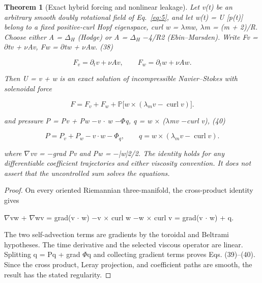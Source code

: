 \documentclass[10pt,letterpaper]{article}
\newtheorem{theorem}{Theorem}[section]
\theoremstyle{remark}
\begin{document}
\begin{theorem}[Exact hybrid forcing and nonlinear leakage]

Let v(t) be an arbitrary smooth doubly rotational field of Eq.~\eqref{eq:5}, and let w(t) = U [p(t)] belong to a fixed positive-curl Hopf eigenspace, curl w = \(\lambda \)mw, \(\lambda \)m = (m + 2)/R. Choose either A = \(\Delta_H\) (Hodge) or A = \(\Delta_H\) \(- \)4/R2 (Ebin–Marsden). Write Fv = \(\partial \)tv + \(\nu \)Av, Fw = \(\partial \)tw + \(\nu \)Aw. (38)


\begin{equation}
\tag{38}\label{eq:38}
F_v=\partial_tv+\nu Av,\qquad F_w=\partial_tw+\nu Aw.
\end{equation}

Then U = v + w is an exact solution of incompressible Navier–Stokes with solenoidal force



\begin{equation}
\tag{39}\label{eq:39}
F=F_v+F_w+\mathbb P\bigl[w\times(\lambda_m v-\operatorname{curl}v)\bigr].
\end{equation}

and pressure P = Pv + Pw \(- \)v \(\cdot \) w \(- \Phi \)q, q = w \(\times \) (\(\lambda \)mv \(- \)curl v), (40)



\begin{equation}
\tag{40}\label{eq:40}
P=P_v+P_w-v\cdot w-\Phi_q,\qquad q=w\times(\lambda_m v-\operatorname{curl}v).
\end{equation}

where \(\nabla \)vv = \(- \)grad Pv and Pw = \(- \)|w|2/2. The identity holds for any differentiable coefficient trajectories and either viscosity convention. It does not assert that the uncontrolled sum solves the equations.


\end{theorem}

\begin{proof}
On every oriented Riemannian three-manifold, the cross-product identity gives

\(\nabla \)vw + \(\nabla \)wv = grad(v \(\cdot \) w) \(- \)v \(\times \) curl w \(- \)w \(\times \) curl v = grad(v \(\cdot \) w) + q.


The two self-advection terms are gradients by the toroidal and Beltrami hypotheses. The time derivative and the selected viscous operator are linear. Splitting q = Pq + grad \(\Phi \)q and collecting gradient terms proves Eqs. (39)–(40). Since the cross product, Leray projection, and coefficient paths are smooth, the result has the stated regularity.


\end{proof}
\end{document}
